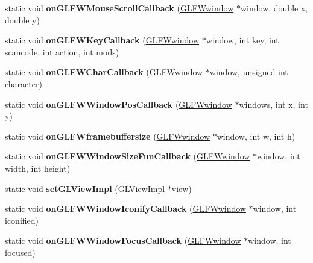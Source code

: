 \begin{DoxyCompactItemize}
\item 
\mbox{\label{classGLFWEventHandler_adf6df6fe09c7decd70d3d4c3897c2ce2}} 
static void {\bfseries on\+G\+L\+F\+W\+Mouse\+Scroll\+Callback} (\hyperlink{group__window_ga3c96d80d363e67d13a41b5d1821f3242}{G\+L\+F\+Wwindow} $\ast$window, double x, double y)
\item 
\mbox{\label{classGLFWEventHandler_a240e3e6f7443edc8ec404975170d37dc}} 
static void {\bfseries on\+G\+L\+F\+W\+Key\+Callback} (\hyperlink{group__window_ga3c96d80d363e67d13a41b5d1821f3242}{G\+L\+F\+Wwindow} $\ast$window, int key, int scancode, int action, int mods)
\item 
\mbox{\label{classGLFWEventHandler_aaf0ff0a316808e2b584e8d2f98c77de9}} 
static void {\bfseries on\+G\+L\+F\+W\+Char\+Callback} (\hyperlink{group__window_ga3c96d80d363e67d13a41b5d1821f3242}{G\+L\+F\+Wwindow} $\ast$window, unsigned int character)
\item 
\mbox{\label{classGLFWEventHandler_a3c2b6c9a0e9b7cf339864f2385f1cf47}} 
static void {\bfseries on\+G\+L\+F\+W\+Window\+Pos\+Callback} (\hyperlink{group__window_ga3c96d80d363e67d13a41b5d1821f3242}{G\+L\+F\+Wwindow} $\ast$windows, int x, int y)
\item 
\mbox{\label{classGLFWEventHandler_af5efd78f04c6b309b30718c639ea4560}} 
static void {\bfseries on\+G\+L\+F\+Wframebuffersize} (\hyperlink{group__window_ga3c96d80d363e67d13a41b5d1821f3242}{G\+L\+F\+Wwindow} $\ast$window, int w, int h)
\item 
\mbox{\label{classGLFWEventHandler_ada92a784331121435a825b4be9102872}} 
static void {\bfseries on\+G\+L\+F\+W\+Window\+Size\+Fun\+Callback} (\hyperlink{group__window_ga3c96d80d363e67d13a41b5d1821f3242}{G\+L\+F\+Wwindow} $\ast$window, int width, int height)
\item 
\mbox{\label{classGLFWEventHandler_a62c82d89d5c00b1edb4c35afe496a38a}} 
static void {\bfseries set\+G\+L\+View\+Impl} (\hyperlink{classGLViewImpl}{G\+L\+View\+Impl} $\ast$view)
\item 
\mbox{\label{classGLFWEventHandler_a2d3ac5fa7d7c506b394993cd4b7cc260}} 
static void {\bfseries on\+G\+L\+F\+W\+Window\+Iconify\+Callback} (\hyperlink{group__window_ga3c96d80d363e67d13a41b5d1821f3242}{G\+L\+F\+Wwindow} $\ast$window, int iconified)
\item 
\mbox{\label{classGLFWEventHandler_a70f02a485d35ed20f5c23d7248105025}} 
static void {\bfseries on\+G\+L\+F\+W\+Window\+Focus\+Callback} (\hyperlink{group__window_ga3c96d80d363e67d13a41b5d1821f3242}{G\+L\+F\+Wwindow} $\ast$window, int focused)
\end{DoxyCompactItemize}


